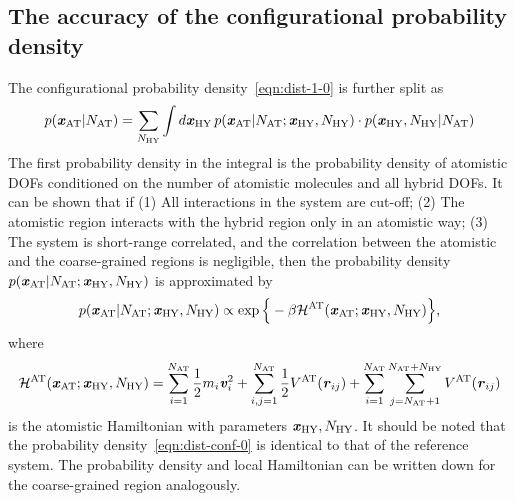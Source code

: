 \documentclass[epjST]{svjour}
\newcommand{\vect}[1]{\textbf{\textit{#1}}}
\newcommand{\mh}[0]{\mathcal {H}}
\newcommand{\AT}[0]{\textrm{AT}}
\newcommand{\HY}[0]{\textrm{HY}}
\begin{document}
\subsection{The accuracy of the configurational probability density}
The configurational probability density~\eqref{eqn:dist-1-0} is further split as
\begin{align}\label{eqn:conf-split}
  p(\vect x_\AT \vert N_\AT) =
  \sum_{N_\HY} \int {d}\vect x_\HY\,
  p(\vect x_\AT \vert N_\AT; \vect x_\HY, N_\HY)\cdot
  p(\vect x_\HY, N_\HY\vert N_\AT)  
\end{align}
The first probability density in the integral is the probability density
of atomistic DOFs conditioned on the number of atomistic molecules and all
hybrid DOFs.
It can be shown that if
(1) All interactions in the system are cut-off;
(2) The atomistic region interacts with the hybrid region only in an atomistic way;
(3) The system is short-range correlated, and the correlation between the atomistic
and the coarse-grained regions is negligible, then the probability density $p(\vect x_\AT \vert N_\AT; \vect x_\HY, N_\HY)$
is approximated by
\begin{align}\label{eqn:dist-conf-0}
  p(\vect x_\AT \vert N_\AT; \vect x_\HY, N_\HY)
  \propto
  \exp\Big\{-\beta \mh^\AT(\vect x_\AT; \vect x_\HY, N_\HY) \Big\},
\end{align}
where 
\begin{align}
  \mh^\AT(\vect x_\AT; \vect x_\HY, N_\HY)
  =
  \sum_{i=1}^{N_\AT}\frac12 m_i\vect v_i^2 +
  \sum_{i,j=1}^{N_\AT} \frac12 V^\AT(\vect r_{ij}) +
  \sum_{i=1}^{N_\AT}\sum_{j=N_\AT+1}^{N_\AT + N_\HY} V^\AT(\vect r_{ij})
\end{align}
is the atomistic Hamiltonian with parameters $\vect x_\HY, N_\HY$. It
should be noted that the probability density~\eqref{eqn:dist-conf-0}
is identical to that of the reference system.
The probability density and local Hamiltonian
can be written down for the coarse-grained region analogously.
\end{document}
